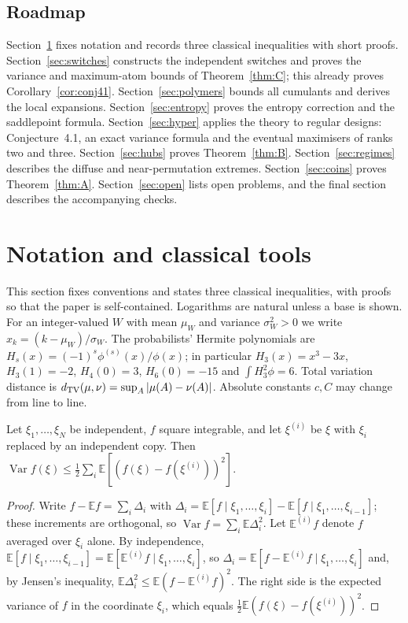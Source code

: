 \documentclass[11pt,a4paper]{article}
\theoremstyle{definition}\newtheorem{remark}[theorem]{Remark}\newtheorem{conjecture}{Conjecture}
\newcommand{\E}{\mathbb E}\newcommand{\Prb}{\mathbb P}\newcommand{\Var}{\operatorname{Var}}
\begin{document}
\subsection{Roadmap}
Section~\ref{sec:tools} fixes notation and records three classical inequalities with short proofs. Section~\ref{sec:switches} constructs the independent switches and proves the variance and maximum-atom bounds of Theorem~\ref{thm:C}; this already proves Corollary~\ref{cor:conj41}. Section~\ref{sec:polymers} bounds all cumulants and derives the local expansions. Section~\ref{sec:entropy} proves the entropy correction and the saddlepoint formula. Section~\ref{sec:hyper} applies the theory to regular designs: Conjecture~4.1, an exact variance formula and the eventual maximisers of ranks two and three. Section~\ref{sec:hubs} proves Theorem~\ref{thm:B}. Section~\ref{sec:regimes} describes the diffuse and near-permutation extremes. Section~\ref{sec:coins} proves Theorem~\ref{thm:A}. Section~\ref{sec:open} lists open problems, and the final section describes the accompanying checks.

\section{Notation and classical tools}\label{sec:tools}
This section fixes conventions and states three classical inequalities, with proofs so that the paper is self-contained. Logarithms are natural unless a base is shown. For an integer-valued $W$ with mean $\mu_W$ and variance $\sigma_W^2>0$ we write $x_k=(k-\mu_W)/\sigma_W$. The probabilists' Hermite polynomials are $H_s(x)=(-1)^s\phi^{(s)}(x)/\phi(x)$; in particular $H_3(x)=x^3-3x$, $H_3(1)=-2$, $H_4(0)=3$, $H_6(0)=-15$ and $\int H_3^2\phi=6$. Total variation distance is $d_{\rm TV}(\mu,\nu)=\sup_A|\mu(A)-\nu(A)|$. Absolute constants $c,C$ may change from line to line.

\begin{lemma}\label{lem:es}
Let $\xi_1,\ldots,\xi_N$ be independent, $f$ square integrable, and let $\xi^{(i)}$ be $\xi$ with $\xi_i$ replaced by an independent copy. Then $\Var f(\xi)\le\tfrac12\sum_i\E[(f(\xi)-f(\xi^{(i)}))^2]$.
\end{lemma}
\begin{proof}
Write $f-\E f=\sum_i\Delta_i$ with $\Delta_i=\E[f\mid\xi_1,\ldots,\xi_i]-\E[f\mid\xi_1,\ldots,\xi_{i-1}]$; these increments are orthogonal, so $\Var f=\sum_i\E\Delta_i^2$. Let $\E^{(i)}f$ denote $f$ averaged over $\xi_i$ alone. By independence, $\E[f\mid\xi_1,\ldots,\xi_{i-1}]=\E[\E^{(i)}f\mid\xi_1,\ldots,\xi_i]$, so $\Delta_i=\E[f-\E^{(i)}f\mid\xi_1,\ldots,\xi_i]$ and, by Jensen's inequality, $\E\Delta_i^2\le\E(f-\E^{(i)}f)^2$. The right side is the expected variance of $f$ in the coordinate $\xi_i$, which equals $\tfrac12\E(f(\xi)-f(\xi^{(i)}))^2$.
\end{proof}
\end{document}
